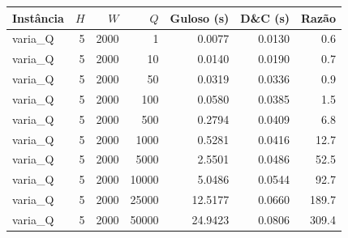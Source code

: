 \begin{tabular}{lrrrrrr}
\toprule
Instância & $H$ & $W$ & $Q$ & Guloso (s) & D\&C (s) & Razão \\
\midrule
varia\_Q & 5 & 2000 & 1 & 0.0077 & 0.0130 & 0.6 \\
varia\_Q & 5 & 2000 & 10 & 0.0140 & 0.0190 & 0.7 \\
varia\_Q & 5 & 2000 & 50 & 0.0319 & 0.0336 & 0.9 \\
varia\_Q & 5 & 2000 & 100 & 0.0580 & 0.0385 & 1.5 \\
varia\_Q & 5 & 2000 & 500 & 0.2794 & 0.0409 & 6.8 \\
varia\_Q & 5 & 2000 & 1000 & 0.5281 & 0.0416 & 12.7 \\
varia\_Q & 5 & 2000 & 5000 & 2.5501 & 0.0486 & 52.5 \\
varia\_Q & 5 & 2000 & 10000 & 5.0486 & 0.0544 & 92.7 \\
varia\_Q & 5 & 2000 & 25000 & 12.5177 & 0.0660 & 189.7 \\
varia\_Q & 5 & 2000 & 50000 & 24.9423 & 0.0806 & 309.4 \\
\bottomrule
\end{tabular}
